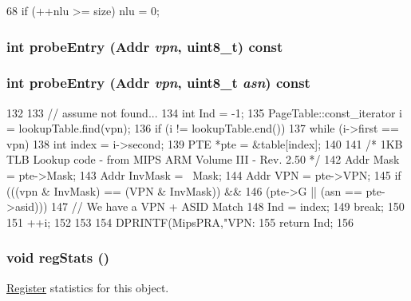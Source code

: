\begin{DoxyCode}
68 { if (++nlu >= size) nlu = 0; }
\end{DoxyCode}
\hypertarget{classMipsISA_1_1TLB_a4dd1511c095e58173f0f7b78eeded1fe}{
\subsubsection[{probeEntry}]{\setlength{\rightskip}{0pt plus 5cm}int probeEntry ({\bf Addr} {\em vpn}, \/  uint8\_\-t) const}}
\label{classMipsISA_1_1TLB_a4dd1511c095e58173f0f7b78eeded1fe}
\hypertarget{classMipsISA_1_1TLB_a4dd1511c095e58173f0f7b78eeded1fe}{
\subsubsection[{probeEntry}]{\setlength{\rightskip}{0pt plus 5cm}int probeEntry ({\bf Addr} {\em vpn}, \/  uint8\_\-t {\em asn}) const}}
\label{classMipsISA_1_1TLB_a4dd1511c095e58173f0f7b78eeded1fe}



\begin{DoxyCode}
132 {
133     // assume not found...
134     int Ind = -1;
135     PageTable::const_iterator i = lookupTable.find(vpn);
136     if (i != lookupTable.end()) {
137         while (i->first == vpn) {
138             int index = i->second;
139             PTE *pte = &table[index];
140 
141             /* 1KB TLB Lookup code - from MIPS ARM Volume III - Rev. 2.50 */
142             Addr Mask = pte->Mask;
143             Addr InvMask = ~Mask;
144             Addr VPN = pte->VPN;
145             if (((vpn & InvMask) == (VPN & InvMask)) &&
146                     (pte->G  || (asn == pte->asid))) {
147                 // We have a VPN + ASID Match
148                 Ind = index;
149                 break;
150             }
151             ++i;
152         }
153     }
154     DPRINTF(MipsPRA,"VPN: %
155     return Ind;
156 }
\end{DoxyCode}
\hypertarget{classMipsISA_1_1TLB_a4dc637449366fcdfc4e764cdf12d9b11}{
\subsubsection[{regStats}]{\setlength{\rightskip}{0pt plus 5cm}void regStats ()}}
\label{classMipsISA_1_1TLB_a4dc637449366fcdfc4e764cdf12d9b11}
\hyperlink{classRegister}{Register} statistics for this object. 

